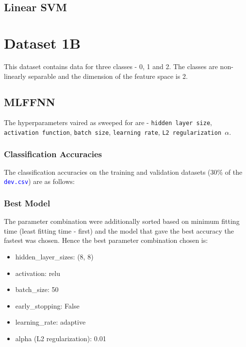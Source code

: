 \documentclass[11pt,a4paper]{article}
\def\tt#1{\texttt{#1}}
\def\colortt#1{\textcolor{blue}{\texttt{#1}}}
\begin{document}
\subsection{Linear SVM}

\break
\section{Dataset 1B}
This dataset contains data for three classes - 0, 1 and 2. The classes are non-linearly separable and the dimension of the feature space is 2.
\subsection{MLFFNN}
The hyperparameters vaired as sweeped for are - \tt{hidden layer size}, \tt{activation function}, \tt{batch size}, \tt{learning rate}, \tt{L2 regularization $\alpha$}.

\subsubsection{Classification Accuracies}
The classification accuracies on the training and validation datasets (30\% of the \colortt{dev.csv}) are as follows:


\subsubsection{Best Model}
The parameter combination were additionally sorted based on minimum fitting time (least fitting time - first) and the model that gave the best accuracy the fastest was chosen. Hence the best parameter combination chosen is:
\begin{itemize}
    \itemsep0em
    \item hidden\_layer\_sizes: (8, 8)
    \item activation: relu
    \item batch\_size: 50
    \item early\_stopping: False
    \item learning\_rate: adaptive
    \item alpha (L2 regularization): 0.01
\end{itemize}
\end{document}
